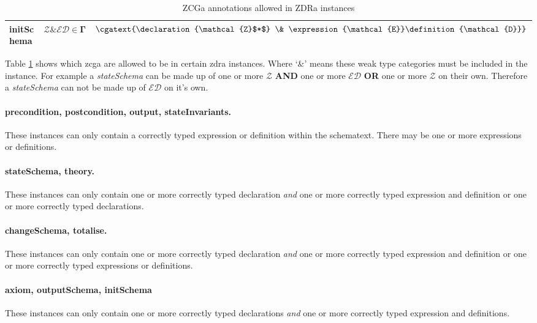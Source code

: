 \begin{table}[H]
\begin{footnotesize}
\begin{tabular}{| l | l | l |}
initSchema & $\mathcal{Z} \& \mathcal{ED} \in \mathbf{\Gamma} $ &
$\cgatext{\declaration{\mathcal{Z}$*$} \&
\expression{\mathcal{E}}\definition{\mathcal{D}}}$ \\

\hline
\end{tabular}

\end{footnotesize}
\caption{ZCGa annotations allowed in ZDRa instances \label{tab:zcgainzdra}}
\end{table}

Table \ref{tab:zcgainzdra} shows which \gls{zcga} are allowed to be in certain
\gls{zdra} instances. Where `\&' means these weak type categories must be
included in the instance. For example a \emph{stateSchema} can be made up of one
or more $\mathcal{Z}$ \textbf{AND} one or more $\mathcal{ED}$ \textbf{OR} one or
more $\mathcal{Z}$ on their own. Therefore a \emph{stateSchema} can not be made
up of $\mathcal{ED}$ on it's own.

\paragraph{precondition, postcondition, output, stateInvariants.}
These instances can only contain a correctly typed expression or definition
within the schematext. There may be one or more expressions or definitions.

\paragraph{stateSchema, theory.}
These instances can only contain one or more correctly typed declaration
\emph{and} one or more correctly typed expression and definition or one or more
correctly typed declarations.

\paragraph{changeSchema, totalise.}
These instances can only contain one or more correctly typed declaration
\emph{and} one or more correctly typed expression and definition or one or more
correctly typed expressions or definitions.

\paragraph{axiom, outputSchema, initSchema}
These instances can only contain one or more correctly typed declarations
\emph{and} one or more correctly typed expression and definitions.

